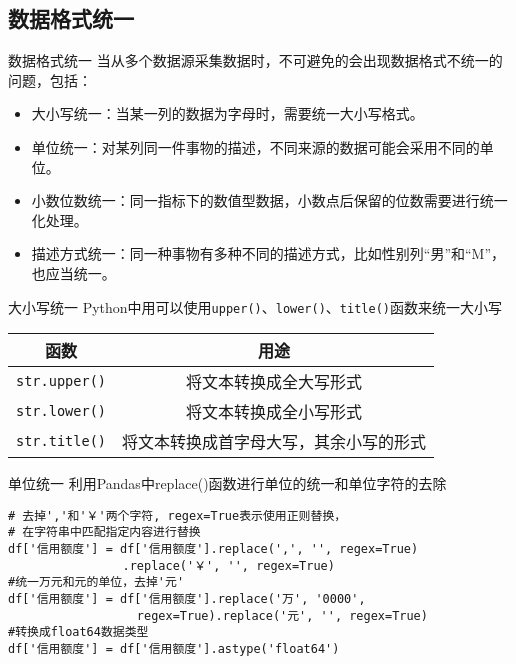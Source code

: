 \documentclass[t]{beamer}
\begin{document}
\subsection{数据格式统一}
\begin{frame}[fragile]{数据格式统一}
    当从多个数据源采集数据时，不可避免的会出现数据格式不统一的问题，包括：
\begin{itemize}
    \item 大小写统一：当某一列的数据为字母时，需要统一大小写格式。
    \item  单位统一：对某列同一件事物的描述，不同来源的数据可能会采用不同的单位。
    \item 小数位数统一：同一指标下的数值型数据，小数点后保留的位数需要进行统一化处理。
    \item 描述方式统一：同一种事物有多种不同的描述方式，比如性别列“男”和“M”，也应当统一。
\end{itemize}
\end{frame}    
   
\begin{frame}[fragile]{大小写统一}
    Python中用可以使用\verb|upper()|、\verb|lower()|、\verb|title()|函数来统一大小写
\begin{center}
\begin{tabular}{cc}
    \hline
    函数&用途\\
    \hline
    \verb|str.upper()| & 将文本转换成全大写形式\\
    \verb|str.lower()| &将文本转换成全小写形式\\
    \verb|str.title()| &将文本转换成首字母大写，其余小写的形式\\
    \hline
\end{tabular}
\end{center}
    
\end{frame}    
    
\begin{frame}[fragile]{单位统一}
    利用Pandas中replace()函数进行单位的统一和单位字符的去除
    \normalsize
\begin{lstlisting}
# 去掉','和'￥'两个字符, regex=True表示使用正则替换，
# 在字符串中匹配指定内容进行替换
df['信用额度'] = df['信用额度'].replace(',', '', regex=True)
                .replace('￥', '', regex=True)
#统一万元和元的单位，去掉'元'
df['信用额度'] = df['信用额度'].replace('万', '0000',
                  regex=True).replace('元', '', regex=True) 
#转换成float64数据类型
df['信用额度'] = df['信用额度'].astype('float64') 
\end{lstlisting}
    
\end{frame}
    
\end{document}

